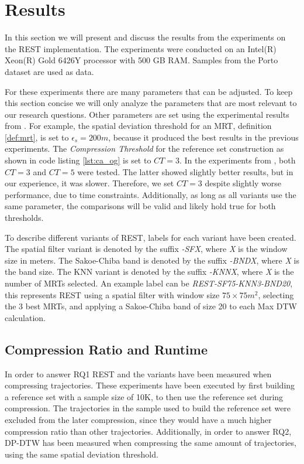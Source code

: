 \chapter{Results}
\label{chap:res}
In this section we will present and discuss the results from the experiments on the REST implementation. The experiments were conducted on an Intel(R) Xeon(R) Gold 6426Y processor with 500 GB RAM. Samples from the Porto dataset are used as data.

For these experiments there are many parameters that can be adjusted. To keep this section concise we will only analyze the parameters that are most relevant to our research questions. Other parameters are set using the experimental results from \textcite{zhao2018rest}. For example, the spatial deviation threshold for an MRT, definition \ref{def:mrt}, is set to $\epsilon_s = 200 m$, because it produced the best results in the previous experiments. The \textit{Compression Threshold} for the reference set construction as shown in code listing \ref{lst:ca_og} is set to $CT = 3$. In the experiments from \textcite{zhao2018rest}, both $CT =3$ and $CT = 5$ were tested. The latter showed slightly better results, but in our experience, it was slower. Therefore, we set $CT = 3$ despite slightly worse performance, due to time constraints. Additionally, as long as all variants use the same parameter, the comparisons will be valid and likely hold true for both thresholds.

To describe different variants of REST, labels for each variant have been created. The spatial filter variant is denoted by the suffix \textit{-SFX}, where \textit{X} is the window size in meters. The Sakoe-Chiba band is denoted by the suffix \textit{-BNDX}, where \textit{X} is the band size. The KNN variant is denoted by the suffix \textit{-KNNX}, where \textit{X} is the number of MRTs selected. An example label can be \textit{REST-SF75-KNN3-BND20}, this represents REST using a spatial filter with window size $75\times75 m^2$, selecting the 3 best MRTs, and applying a Sakoe-Chiba band of size 20 to each Max DTW calculation.

\section{Compression Ratio and Runtime}
In order to answer RQ1 REST and the variants have been measured when compressing trajectories. These experiments have been executed by first building a reference set with a sample size of 10K, to then use the reference set during compression. The trajectories in the sample used to build the reference set were excluded from the later compression, since they would have a much higher compression ratio than other trajectories. Additionally, in order to answer RQ2, DP-DTW has been measured when compressing the same amount of trajectories, using the same spatial deviation threshold.

